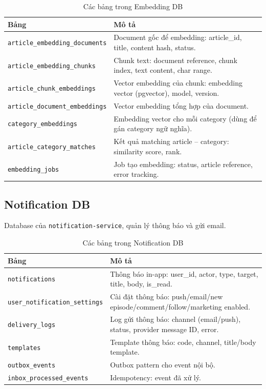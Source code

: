 \documentclass[14pt,a4paper,oneside]{extreport}
\begin{document}
\begin{table}[H]
\centering
\caption{Các bảng trong Embedding DB}
\label{tab:er-embedding}
\renewcommand{\arraystretch}{1.3}
\small
\begin{tabularx}{\textwidth}{|l|X|}
\hline
\textbf{Bảng} & \textbf{Mô tả} \\
\hline
\texttt{article\_embedding\_documents} & Document gốc để embedding: article\_id, title, content hash, status. \\
\hline
\texttt{article\_embedding\_chunks} & Chunk text: document reference, chunk index, text content, char range. \\
\hline
\texttt{article\_chunk\_embeddings} & Vector embedding của chunk: embedding vector (pgvector), model, version. \\
\hline
\texttt{article\_document\_embeddings} & Vector embedding tổng hợp của document. \\
\hline
\texttt{category\_embeddings} & Embedding vector cho mỗi category (dùng để gán category ngữ nghĩa). \\
\hline
\texttt{article\_category\_matches} & Kết quả matching article -- category: similarity score, rank. \\
\hline
\texttt{embedding\_jobs} & Job tạo embedding: status, article reference, error tracking. \\
\hline
\end{tabularx}
\end{table}

\subsection{Notification DB}

Database của \texttt{notification-service}, quản lý thông báo và gửi email.

\begin{table}[H]
\centering
\caption{Các bảng trong Notification DB}
\label{tab:er-notification}
\renewcommand{\arraystretch}{1.3}
\small
\begin{tabularx}{\textwidth}{|l|X|}
\hline
\textbf{Bảng} & \textbf{Mô tả} \\
\hline
\texttt{notifications} & Thông báo in-app: user\_id, actor, type, target, title, body, is\_read. \\
\hline
\texttt{user\_notification\_settings} & Cài đặt thông báo: push/email/new episode/comment/follow/marketing enabled. \\
\hline
\texttt{delivery\_logs} & Log gửi thông báo: channel (email/push), status, provider message ID, error. \\
\hline
\texttt{templates} & Template thông báo: code, channel, title/body template. \\
\hline
\texttt{outbox\_events} & Outbox pattern cho event nội bộ. \\
\hline
\texttt{inbox\_processed\_events} & Idempotency: event đã xử lý. \\
\hline
\end{tabularx}
\end{table}
\end{document}
